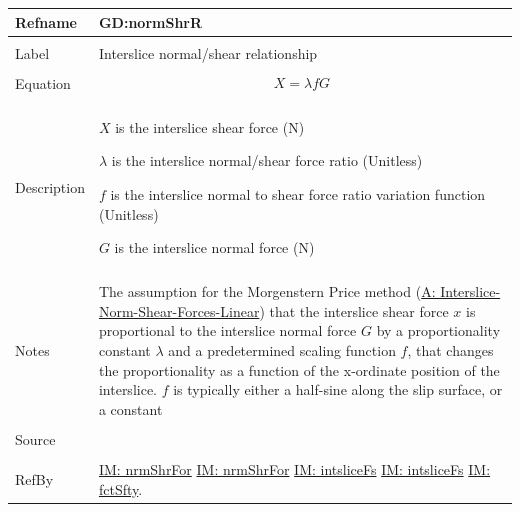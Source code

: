 \documentclass[12pt]{article}
\begin{document}
\noindent \begin{minipage}{\textwidth}
\begin{tabular}{p{} p{}}
\toprule \textbf{Refname} & \textbf{GD:normShrR}
\label{GD:normShrR}
\\ \midrule \\
Label & Interslice normal/shear relationship
        \\ \midrule \\
        Equation & \begin{displaymath}
                   X=λ f G
                   \end{displaymath}
                   \\ \midrule \\
                   Description & \begin{symbDescription}
                                 \item{$X$ is the interslice shear force (N)}
                                 \item{$λ$ is the interslice normal/shear force ratio (Unitless)}
                                 \item{$f$ is the interslice normal to shear force ratio variation function (Unitless)}
                                 \item{$G$ is the interslice normal force (N)}
                                 \end{symbDescription}
                                 \\ \midrule \\
                                 Notes & The assumption for the Morgenstern Price method (\hyperref[A:Interslice-Norm-Shear-Forces-Linear]{A: Interslice-Norm-Shear-Forces-Linear}) that the interslice shear force $x$ is proportional to the interslice normal force $G$ by a proportionality constant $λ$ and a predetermined scaling function $f$, that changes the proportionality as a function of the x-ordinate position of the interslice. $f$ is typically either a half-sine along the slip surface, or a constant
                                         \\ \midrule \\
                                         Source & \cite{chen2005}
                                                  \\ \midrule \\
                                                  RefBy & \hyperref[IM:nrmShrFor]{IM: nrmShrFor} \hyperref[IM:nrmShrFor]{IM: nrmShrFor} \hyperref[IM:intsliceFs]{IM: intsliceFs} \hyperref[IM:intsliceFs]{IM: intsliceFs} \hyperref[IM:fctSfty]{IM: fctSfty}.
\\ \bottomrule \end{tabular}
\end{minipage}
\par~
\end{document}
